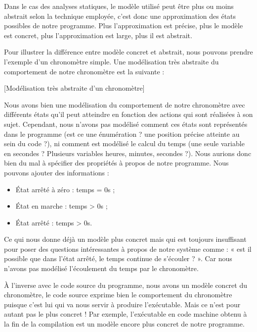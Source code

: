 Dans le cas des analyses statiques, le modèle utilisé peut être plus ou moins 
abstrait selon la technique employée, c'est donc une approximation des états 
possibles de notre programme. Plus l'approximation est précise, plus le modèle est
concret, plus l'approximation est large, plus il est abstrait.



Pour illustrer la différence entre modèle concret et abstrait, nous pouvons 
prendre l'exemple d'un chronomètre simple. Une modélisation très abstraite du
comportement de notre chronomètre est la suivante :


[Modélisation très abstraite d'un chronomètre]


Nous avons bien une modélisation du comportement de notre chronomètre avec 
différents états qu'il peut atteindre en fonction des actions qui sont réalisées
à son sujet. Cependant, nous n'avons pas modélisé comment ces états sont 
représentés dans le programme (est ce une énumération ? une position précise 
atteinte au sein du code ?), ni comment est modélisé le calcul du temps (une seule
variable en secondes ? Plusieurs variables heures, minutes, secondes ?). Nous 
aurions donc bien du mal à spécifier des propriétés à propos de notre programme. 
Nous pouvons ajouter des informations :



\begin{itemize}
\item État arrêté à zéro : temps = 0s ;
\item État en marche : temps > 0s ;
\item État arrêté : temps > 0s.
\end{itemize}


Ce qui nous donne déjà un modèle plus concret mais qui est toujours insuffisant 
pour poser des questions intéressantes à propos de notre système comme : « est il 
possible que dans l'état arrêté, le temps continue de s'écouler ? ». Car nous
n'avons pas modélisé l'écoulement du temps par le chronomètre.



À l'inverse avec le code source du programme, nous avons un modèle concret du
chronomètre, le code source exprime bien le comportement du chronomètre puisque
c'est lui qui va nous servir à produire l'exécutable. Mais ce n'est pour autant
pas le plus concret ! Par exemple, l'exécutable en code machine obtenu à la fin
de la compilation est un modèle encore plus concret de notre programme.



